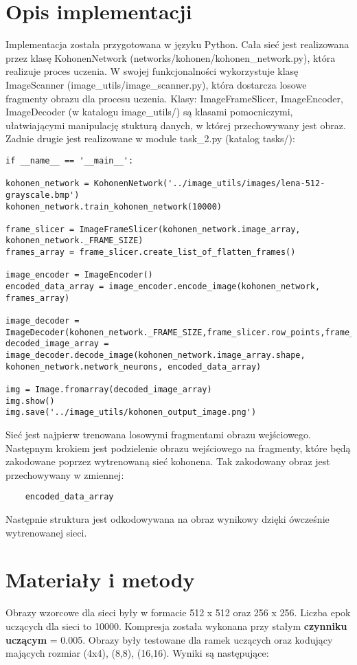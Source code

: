 \documentclass{classrep}
\begin{document}
\section{Opis implementacji}
{Implementacja została przygotowana w języku Python. Cała sieć jest realizowana przez klasę KohonenNetwork (networks\slash kohonen\slash kohonen{\_}network.py), która realizuje proces uczenia. W swojej funkcjonalności wykorzystuje klasę ImageScanner (image{\_}utils\slash image{\_}scanner.py), która dostarcza losowe fragmenty obrazu dla procesu uczenia. Klasy: ImageFrameSlicer, ImageEncoder, ImageDecoder (w katalogu image{\_}utils\slash) są klasami pomocniczymi, ułatwiającymi manipulację stukturą danych, w której przechowywany jest obraz. Zadnie drugie jest realizowane w module task{\_}2.py (katalog tasks\slash): 
\begin{lstlisting}
if __name__ == '__main__':

kohonen_network = KohonenNetwork('../image_utils/images/lena-512-grayscale.bmp')
kohonen_network.train_kohonen_network(10000)

frame_slicer = ImageFrameSlicer(kohonen_network.image_array, kohonen_network._FRAME_SIZE)
frames_array = frame_slicer.create_list_of_flatten_frames()

image_encoder = ImageEncoder()
encoded_data_array = image_encoder.encode_image(kohonen_network, frames_array)

image_decoder = ImageDecoder(kohonen_network._FRAME_SIZE,frame_slicer.row_points,frame_slicer.column_points)
decoded_image_array = image_decoder.decode_image(kohonen_network.image_array.shape, kohonen_network.network_neurons, encoded_data_array)

img = Image.fromarray(decoded_image_array)
img.show()
img.save('../image_utils/kohonen_output_image.png')
\end{lstlisting}
Sieć jest najpierw trenowana losowymi fragmentami obrazu wejściowego. Następnym krokiem jest podzielenie obrazu wejściowego na fragmenty, które będą zakodowane poprzez wytrenowaną sieć kohonena. Tak zakodowany obraz jest przechowywany w zmiennej: 
\begin{lstlisting}
	encoded_data_array
\end{lstlisting}
Następnie struktura jest odkodowywana na obraz wynikowy dzięki ówcześnie wytrenowanej sieci.
}

\section{Materiały i metody}
{Obrazy wzorcowe dla sieci były w formacie 512 x 512 oraz 256 x 256. Liczba epok uczących dla sieci to 10000. Kompresja została wykonana przy stałym \textbf{czynniku uczącym} = 0.005. Obrazy były testowane dla ramek uczących oraz kodujący mających rozmiar (4x4), (8,8), (16,16). Wyniki są następujące:	
}
\end{document}
